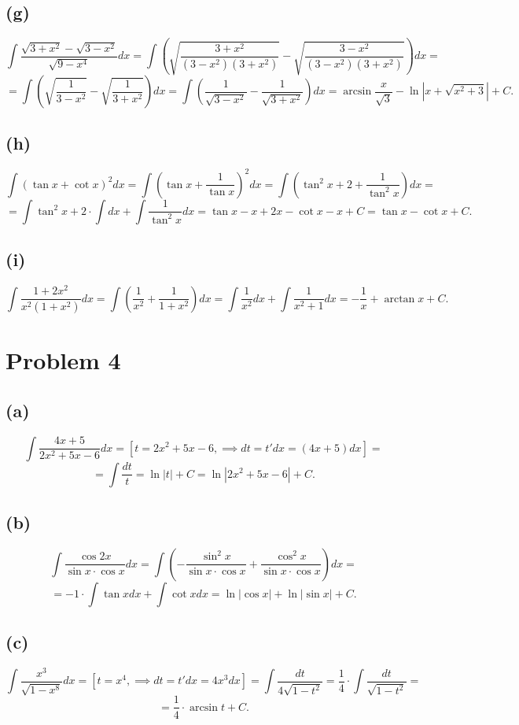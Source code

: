 \documentclass{article}
\begin{document}
\subsection*{(g)}
$$\int\frac{\sqrt{3 + x^2} - \sqrt{3 - x^2}}{\sqrt{9 - x^4}}dx = \int\left(\sqrt{\frac{3 + x^2}{(3 - x^2)(3 + x^2)}} - \sqrt{\frac{3 - x^2}{(3 - x^2)(3 + x^2)}}\right)dx = $$
$$ = \int\left(\sqrt{\frac{1}{3 - x^2}} - \sqrt{\frac{1}{3 + x^2}}\right)dx = \int\left(\frac{1}{\sqrt{3 - x^2}} - \frac{1}{\sqrt{3 + x^2}}\right)dx = \arcsin{\frac{x}{\sqrt{3}}} - \ln{|x + \sqrt{x^2 + 3}|} + C.$$
\subsection*{(h)}
$$\int(\tan{x} + \cot{x})^2dx = \int\left(\tan{x} + \frac{1}{\tan{x}}\right)^2dx = \int\left(\tan^2{x} + 2 + \frac{1}{\tan^2{x}}\right)dx = $$
$$ = \int\tan^2{x} + 2\cdot\int dx + \int\frac{1}{\tan^2{x}}dx = \tan{x} - x + 2x - \cot{x} - x + C = \tan{x} - \cot{x} + C.$$
\subsection*{(i)}
$$\int\frac{1 + 2x^2}{x^2(1 + x^2)}dx = \int\left(\frac{1}{x^2} + \frac{1}{1 + x^2}\right)dx = \int\frac{1}{x^2}dx + \int\frac{1}{x^2 + 1}dx = -\frac{1}{x} + \arctan{x} + C.$$
\section*{Problem 4}
\subsection*{(a)}
$$\int\frac{4x + 5}{2x^2 + 5x - 6}dx = \left[t = 2x^2 + 5x - 6,\implies dt = t'dx = (4x + 5)dx\right] = $$
$$ = \int\frac{dt}{t} = \ln{|t|} + C = \ln{|2x^2 + 5x - 6|} + C.$$
\subsection*{(b)}
$$\int\frac{\cos{2x}}{\sin{x}\cdot\cos{x}}dx = \int\left(-\frac{\sin^2{x}}{\sin{x}\cdot\cos{x}} + \frac{\cos^2{x}}{\sin{x}\cdot\cos{x}}\right)dx =$$
$$ = -1\cdot\int\tan{x}dx + \int\cot{x}dx = \ln{|\cos{x}|} + \ln{|\sin{x}|} + C.$$
\subsection*{(c)}
$$\int\frac{x^3}{\sqrt{1 - x^8}}dx = \left[t = x^4,\implies dt = t'dx = 4x^3dx\right] = \int\frac{dt}{4\sqrt{1 - t^2}} = \frac{1}{4}\cdot\int\frac{dt}{\sqrt{1 - t^2}} = $$
$$ = \frac{1}{4}\cdot\arcsin{t} + C.$$
\end{document}
